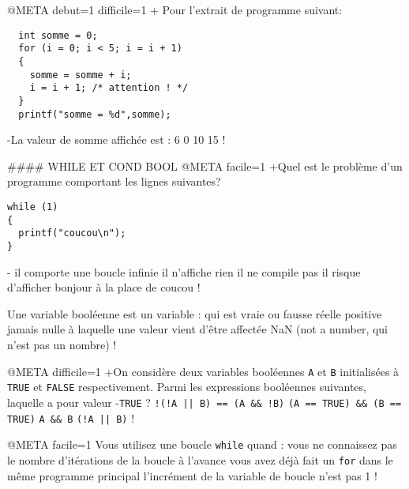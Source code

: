 @META debut=1 difficile=1
+ Pour l'extrait de programme suivant:
 \begin{verbatim}
  int somme = 0;
  for (i = 0; i < 5; i = i + 1)
  {
    somme = somme + i;
    i = i + 1; /* attention ! */
  }
  printf("somme = %d",somme);
\end{verbatim}
-La valeur de somme affichée est :
 6
 0
 10
 15
!

#### WHILE ET COND BOOL
@META facile=1
+Quel est le problème d'un programme comportant les lignes suivantes?
\begin{verbatim}
while (1)
{
  printf("coucou\n");
}
\end{verbatim}
-
  il comporte une boucle infinie
  il n'affiche rien
  il ne compile pas
  il risque d'afficher bonjour à la place de coucou
!

Une variable booléenne est un variable :
 qui est vraie ou fausse
 réelle positive
 jamais nulle
 à laquelle une valeur vient d'être affectée
 NaN (not a number, qui n'est pas un nombre)
!


@META difficile=1
+On considère deux variables booléennes \verb|A| et \verb|B|
initialisées à \verb|TRUE| et \verb|FALSE| respectivement. Parmi
les expressions booléennes suivantes, laquelle a pour valeur
-\verb|TRUE| ?
 \verb+!(!A || B) == (A && !B)+
 \verb|(A == TRUE) && (B == TRUE)|
 \verb|A && B|
 \verb+(!A || B)+
!

@META facile=1
Vous utilisez une boucle \verb|while| quand :
 vous ne connaissez pas le nombre d'itérations de la boucle à l'avance
 vous avez déjà fait un  \verb|for| dans le même programme principal
 l'incrément de la variable de boucle n'est pas 1
!
